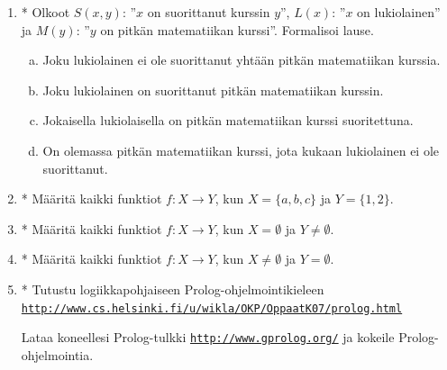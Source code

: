 \begin{enumerate}
\item * %
Olkoot $S(x, y)$: ''$x$ on suorittanut
kurssin $y$'', $L(x)$: ''$x$ on lukiolainen'' ja $M(y)$: ''$y$ on
pitkän matematiikan kurssi''. Formalisoi lause.
\begin{enumerate}[a)]
\item Joku lukiolainen ei ole suorittanut yhtään pitkän
matematiikan kurssia.
\item Joku lukiolainen on suorittanut pitkän matematiikan
kurssin.
\item Jokaisella lukiolaisella on pitkän matematiikan kurssi
suoritettuna.
\item On olemassa pitkän matematiikan kurssi, jota kukaan
lukiolainen ei ole suorittanut.
\end{enumerate}

\item * %
Määritä kaikki funktiot $f\colon X\to Y$,
kun $X=\{a, b, c\}$ ja $Y=\{1, 2\}$.

\item * %
Määritä kaikki funktiot $f\colon X\to Y$,
kun $X=\emptyset$ ja $Y\neq \emptyset$.

\item * %
Määritä kaikki funktiot $f\colon X\to Y$,
kun $X\neq \emptyset$ ja $Y= \emptyset$.

\item * %
Tutustu logiikkapohjaiseen Prolog-ohjelmointikieleen\\
\href{http://www.cs.helsinki.fi/u/wikla/OKP/OppaatK07/prolog.html}
{{\tt http://www.cs.helsinki.fi/u/wikla/OKP/OppaatK07/prolog.html}}

Lataa koneellesi Prolog-tulkki \href{http://www.gprolog.org/}
{{\tt http://www.gprolog.org/}}
ja kokeile Prolog-ohjelmointia.

\end{enumerate}
